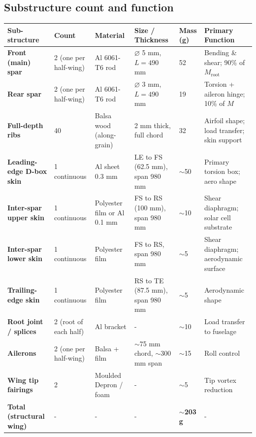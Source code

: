 \documentclass[10pt,a4paper]{article}
\begin{document}
\subsection{Substructure count and function}

\begin{landscape}
\begin{center}
\renewcommand{\arraystretch}{1.2}
\begin{tabularx}{\linewidth}{|p{3cm}|p{2cm}|p{2.5cm}|p{3cm}|p{1.8cm}|X|}
\hline
Sub-structure & Count & Material & Size / Thickness & Mass (g) & Primary Function \\
\hline
\textbf{Front (main) spar} & 2 (one per half-wing) & Al 6061-T6 rod & $\varnothing$ 5 mm, $L = 490$ mm & 52 & Bending \& shear; 90\% of $M_{\text{root}}$ \\
\hline
\textbf{Rear spar} & 2 (one per half-wing) & Al 6061-T6 rod & $\varnothing$ 3 mm, $L = 490$ mm & 19 & Torsion + aileron hinge; 10\% of $M$ \\
\hline
\textbf{Full-depth ribs} & 40 & Balsa wood (along-grain) & 2 mm thick, full chord & 32 & Airfoil shape; load transfer; skin support \\
\hline
\textbf{Leading-edge D-box skin} & 1 continuous & Al sheet 0.3 mm & LE to FS (62.5 mm), span 980 mm & $\sim$50 & Primary torsion box; aero shape \\
\hline
\textbf{Inter-spar upper skin} & 1 continuous & Polyester film or Al 0.1 mm & FS to RS (100 mm), span 980 mm & $\sim$10 & Shear diaphragm; solar cell substrate \\
\hline
\textbf{Inter-spar lower skin} & 1 continuous & Polyester film & FS to RS, span 980 mm & $\sim$5 & Shear diaphragm; aerodynamic surface \\
\hline
\textbf{Trailing-edge skin} & 1 continuous & Polyester film & RS to TE (87.5 mm), span 980 mm & $\sim$5 & Aerodynamic shape \\
\hline
\textbf{Root joint / splices} & 2 (root of each half) & Al bracket & - & $\sim$10 & Load transfer to fuselage \\
\hline
\textbf{Ailerons} & 2 (one per half-wing) & Balsa + film & $\sim$75 mm chord, $\sim$300 mm span & $\sim$15 & Roll control \\
\hline
\textbf{Wing tip fairings} & 2 & Moulded Depron / foam & - & $\sim$5 & Tip vortex reduction \\
\hline
\textbf{Total (structural wing)} & - & - & - & \textbf{$\sim$203 g} & - \\
\hline
\end{tabularx}
\end{center}
\end{landscape}
\end{document}
